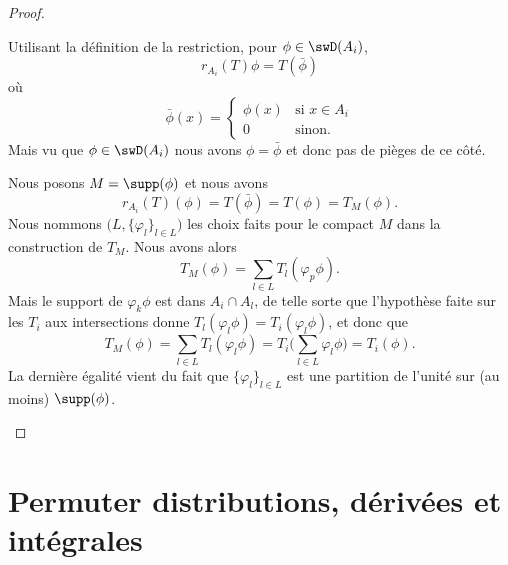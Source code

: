 \begin{proof}
\begin{subproof}
        Utilisant la définition de la restriction, pour \( \phi\in \swD(A_i)\),
        \begin{equation}
            r_{A_i}(T)\phi=T(\bar \phi)
        \end{equation}
        où
        \begin{equation}
            \bar\phi(x)=\begin{cases}
                \phi(x)    &   \text{si } x\in A_i\\
                0    &    \text{sinon. }
            \end{cases}
        \end{equation}
        Mais vu que \( \phi\in \swD(A_i)\) nous avons \( \phi=\bar\phi\) et donc pas de pièges de ce côté.

        Nous posons \( M=\supp(\phi)\) et nous avons
        \begin{equation}
            r_{A_i}(T)(\phi)=T(\bar\phi)=T(\phi)=T_M(\phi).
        \end{equation}
        Nous nommons \( \big( L, \{ \varphi_l \}_{l\in L} \big)\) les choix faits pour le compact \( M\) dans la construction de \( T_M\). Nous avons alors
        \begin{equation}
            T_M(\phi)=\sum_{l\in L}T_l(\varphi_p\phi).
        \end{equation}
        Mais le support de \( \varphi_k\phi\) est dans \( A_i\cap A_l\), de telle sorte que l'hypothèse faite sur les \( T_i\) aux intersections donne \( T_l(\varphi_l\phi)=T_i(\varphi_l\phi)\), et donc que
        \begin{equation}
            T_M(\phi)=\sum_{l\in L}T_l(\varphi_l\phi)=T_i\big( \sum_{l\in L}\varphi_l\phi \big)=T_i(\phi).
        \end{equation}
        La dernière égalité vient du fait que \( \{ \varphi_l \}_{l\in L}\) est une partition de l'unité sur (au moins) \( \supp(\phi)\).
    \end{subproof}
\end{proof}

\section{Permuter distributions, dérivées et intégrales}

